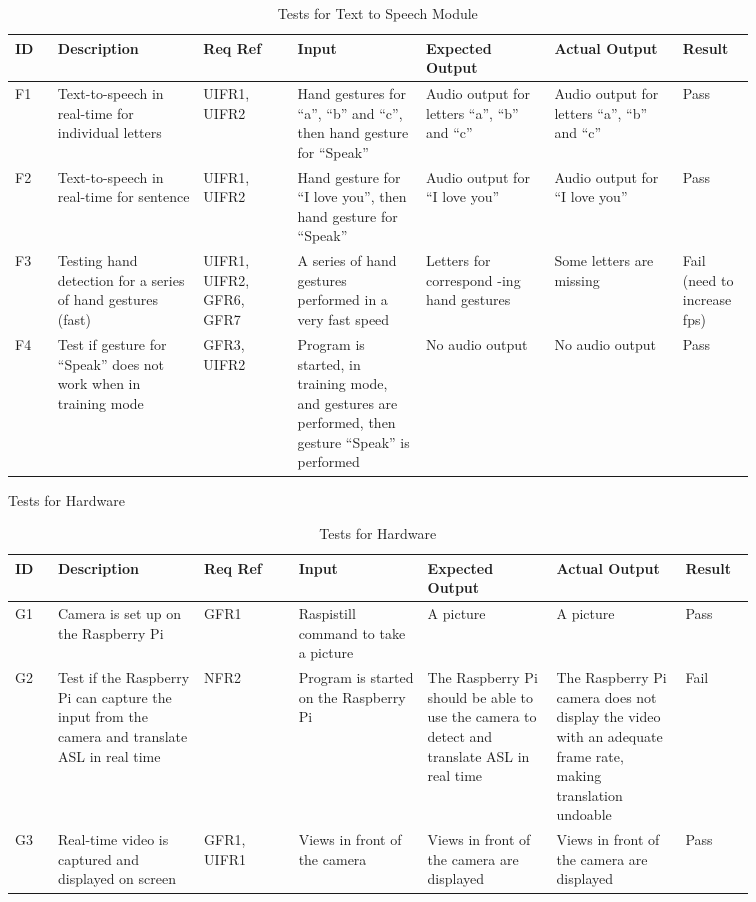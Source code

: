 \documentclass[12pt, titlepage]{article}
\begin{document}
\renewcommand{\arraystretch}{1.2}
\noindent \begin{longtable}{p{0.05\linewidth}|p{0.17\linewidth}|p{0.11\linewidth}|p{0.15\linewidth}|p{0.15\linewidth}|p{0.15\linewidth}|p{0.08\linewidth}}
\hline
\textbf{ID} & \textbf{Description} & \textbf{Req Ref} & \textbf{Input} & \textbf{Expected Output} & \textbf{Actual Output} & \textbf{Result}\\
\hline
F1 & Text-to-speech in real-time for individual letters & UIFR1, UIFR2 & Hand gestures for “a”, “b” and “c”, then hand gesture for “Speak” & Audio output for letters “a”, “b” and “c” & Audio output for letters “a”, “b” and “c” & Pass\\ \hline
F2 & Text-to-speech in real-time for sentence & UIFR1, UIFR2 & Hand gesture for “I love you”, then hand gesture for “Speak” & Audio output for “I love you” & Audio output for “I love you” & Pass\\ \hline
F3 & Testing hand detection for a series of hand gestures (fast) & UIFR1, UIFR2, GFR6, GFR7 & A series of hand gestures performed in a very fast speed & Letters for correspond -ing hand gestures & Some letters are missing & Fail (need to increase fps)\\ \hline
\newpage
\hline
F4 & Test if gesture for “Speak” does not work when in training mode & GFR3, UIFR2 & Program is started, in training mode, and gestures are performed, then gesture “Speak” is performed & No audio output & No audio output & Pass
\hline
\caption{Tests for Text to Speech Module}
\end{longtable}

\newpage
\centerline{Tests for Hardware}

\renewcommand{\arraystretch}{1.2}
\noindent \begin{longtable}{p{0.05\linewidth}|p{0.17\linewidth}|p{0.11\linewidth}|p{0.15\linewidth}|p{0.15\linewidth}|p{0.15\linewidth}|p{0.08\linewidth}}
\hline
\textbf{ID} & \textbf{Description} & \textbf{Req Ref} & \textbf{Input} & \textbf{Expected Output} & \textbf{Actual Output} & \textbf{Result}\\
\hline
G1 & Camera is set up on the Raspberry Pi & GFR1 & Raspistill command to take a picture & A picture & A picture & Pass\\ \hline
G2 & Test if the Raspberry Pi can capture the input from the camera and translate ASL in real time & NFR2 & Program is started on the Raspberry Pi & The Raspberry Pi should be able to use the camera to detect and translate ASL in real time & The Raspberry Pi camera does not display the video with an adequate frame rate, making translation undoable & Fail\\ \hline
G3 & Real-time video is captured and displayed on screen & GFR1, UIFR1 & Views in front of the camera & Views in front of the camera are displayed & Views in front of the camera are displayed & Pass
\hline
\caption{Tests for Hardware}
\end{longtable}
\end{document}
